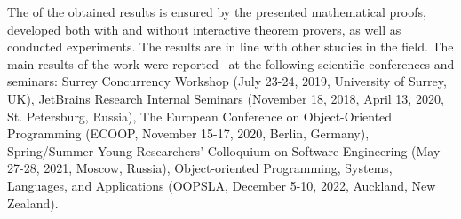 The {\reliability} of the obtained results is ensured by the presented mathematical proofs, developed both with and without interactive theorem provers, as well as conducted experiments.
The results are in line with other studies in the field.
{\probation} The main results of the work were reported~ at the following scientific conferences and seminars:
Surrey Concurrency Workshop (July 23-24, 2019, University of Surrey, UK), JetBrains Research Internal Seminars (November 18, 2018, April 13, 2020, St. Petersburg, Russia),
The European Conference on Object-Oriented Programming (ECOOP, November 15-17, 2020, Berlin, Germany),
Spring/Summer Young Researchers' Colloquium on Software Engineering
(May 27-28, 2021, Moscow, Russia),
Object-oriented Programming, Systems, Languages, and Applications
(OOPSLA, December 5-10, 2022, Auckland, New Zealand).


